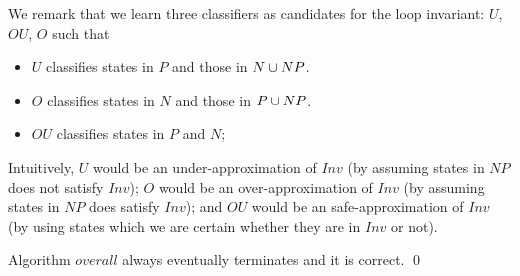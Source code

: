 We remark that we learn three classifiers as candidates for the loop invariant: $U$, $OU$, $O$ such that
\begin{itemize}
\item $U$ classifies states in $P$ and those in $N \cup NP$.
\item $O$ classifies states in $N$ and those in $P \cup NP$.
\item $OU$ classifies states in $P$ and $N$;
\end{itemize}
Intuitively, $U$ would be an under-approximation of $Inv$ (by assuming states in $NP$ does not satisfy $Inv$); $O$ would be an over-approximation of $Inv$ (by assuming states in $NP$ does satisfy $Inv$); and $OU$ would be an safe-approximation of $Inv$ (by using states which we are certain whether they are in $Inv$ or not).
\begin{example}
\end{example}


\begin{theorem}
Algorithm $overall$ always eventually terminates and it is correct. \hfill \qed
\end{theorem}
